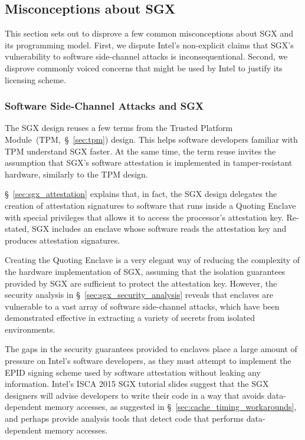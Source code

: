 \subsection{Misconceptions about SGX}
\label{sec:sgx_misconceptions}

This section sets out to disprove a few common misconceptions about SGX and its
programming model. First, we dispute Intel's non-explicit claims that SGX's
vulnerability to software side-channel attacks is inconsequentional. Second, we
disprove commonly voiced concerns that might be used by Intel to justify its
licensing scheme.


\subsubsection{Software Side-Channel Attacks and SGX}

The SGX design reuses a few terms from the Trusted Platform
Module~(TPM,~\S~\ref{sec:tpm}) design. This helps software developers familiar
with TPM understand SGX faster. At the same time, the term reuse invites the
assumption that SGX's software attestation is implemented in tamper-resistant
hardware, similarly to the TPM design.

\S~\ref{sec:sgx_attestation} explains that, in fact, the SGX design delegates
the creation of attestation signatures to software that runs inside a
Quoting Enclave with special privileges that allows it to access the
processor's attestation key. Re-stated, SGX includes an enclave whose
software reads the attestation key and produces attestation signatures.

Creating the Quoting Enclave is a very elegant way of reducing the complexity
of the hardware implementation of SGX, assuming that the isolation guarantees
provided by SGX are sufficient to protect the attestation key. However, the
security analysis in \S~\ref{sec:sgx_security_analysis} reveals that enclaves
are vulnerable to a vast array of software side-channel attacks, which have
been demonstrated effective in extracting a variety of secrets from isolated
environments.


The gaps in the security guarantees provided to enclaves place a large amount
of pressure on Intel's software developers, as they must attempt to implement
the EPID signing scheme used by software attestation without leaking any
information. Intel's ISCA 2015 SGX tutorial slides suggest that the SGX
designers will advise developers to write their code in a way that avoids
data-dependent memory accesses, as suggested in
\S~\ref{sec:cache_timing_workarounds}, and perhaps provide analysis tools that
detect code that performs data-dependent memory accesses.

